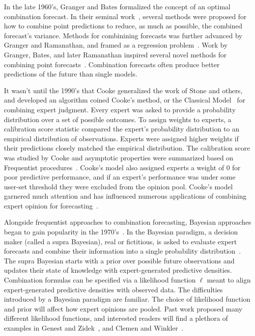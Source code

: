 \documentclass[preprint,authoryear]{elsarticle}
\begin{document}
In the late 1960's, Granger and Bates formalized the concept of an optimal combination forecast.
In their seminal work~\citep{bates1969combination}, several methods were proposed for how to combine point predictions to reduce, as much as possible, the combined forecast's variance.
Methods for combinining forecasts was further advanced by Granger and Ramanathan, and framed as a regression problem~\citep{granger1984improved}.
Work by Granger, Bates, and later Ramanathan inspired several novel methods for combining point forecasts~\citep{gneiting2013combining,hora2015calibration,cooke1991experts,wallis2011combining}.
Combination forecasts often produce better predictions of the future than single models.

It wasn't until the 1990's that Cooke generalized the work of Stone and others, and developed an algorithm coined Cooke's method, or the Classical Model~\citep{cooke1988calibration,cooke1991experts} for combining expert judgment.
Every expert was asked to provide a probability distribution over a set of possible outcomes.
To assign weights to experts, a calibration score statistic compared the expert's probability distribution to an empirical distribution of observations.
Experts were assigned higher weights if their predictions closely matched the empirical distribution.
The calibration score was studied by Cooke and asymptotic properties were summarized based on Frequentist procedures~\citep{cooke1988calibration,cooke2015aggregation}.
Cooke's model also assigned experts a weight of $0$ for poor predictive performance, and
if an expert's performance was under some user-set threshold they were excluded from the opinion pool.
Cooke's model garnered much attention and has influenced numerous applications of combining expert opinion for forecasting~\citep{cooke2014validating,clemen2008comment,cooke2015aggregation}.

Alongside frequentist approaches to combination forecasting, Bayesian approaches began to gain popularity in the 1970's~\citep{morris1974decision}.
In the Bayesian paradigm, a decision maker (called a supra Bayesian), real or fictitious, is asked to evaluate expert forecasts and combine their information into a single probability distribution~\citep{hogarth1975cognitive,keeney1976group}.
The supra Bayesian starts with a prior over possible future observations and updates their state of knowledge with expert-generated predictive densities.
Combination formulas can be specified via a likelihood function $\ell$ meant to align expert-generated predictive densities with observed data.
The difficulties introduced by a Bayesian paradigm are familiar.
The choice of likelihood function and prior will affect how expert opinions are pooled. 
Past work proposed many different likelihood functions, and interested readers will find a plethora of examples in Genest and Zidek~\citep{genest1986combining}, and Clemen and Winkler~\cite{clemen1999combining,clemen1986combining,clemen1989combining}.
\end{document}
